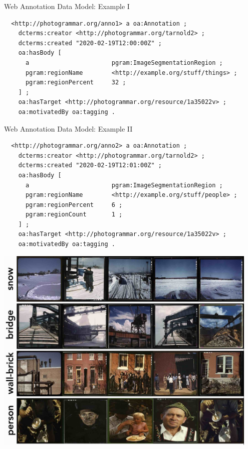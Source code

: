 \documentclass[12pt,ignorenonframetext,aspectratio=169]{beamer}
\begin{document}
\begin{frame}[fragile]{Web Annotation Data Model: Example I}

\fontsize{9}{11}\selectfont

  \begin{verbatim}
  <http://photogrammar.org/anno1> a oa:Annotation ;
    dcterms:creator <http://photogrammar.org/tarnold2> ;
    dcterms:created "2020-02-19T12:00:00Z" ;
    oa:hasBody [
      a                       pgram:ImageSegmentationRegion ;
      pgram:regionName        <http://example.org/stuff/things> ;
      pgram:regionPercent     32 ;
    ] ;
    oa:hasTarget <http://photogrammar.org/resource/1a35022v> ;
    oa:motivatedBy oa:tagging .
  \end{verbatim}

\end{frame}


\begin{frame}[fragile]{Web Annotation Data Model: Example II}

\fontsize{9}{11}\selectfont

  \begin{verbatim}
  <http://photogrammar.org/anno2> a oa:Annotation ;
    dcterms:creator <http://photogrammar.org/tarnold2> ;
    dcterms:created "2020-02-19T12:01:00Z" ;
    oa:hasBody [
      a                       pgram:ImageSegmentationRegion ;
      pgram:regionName        <http://example.org/stuff/people> ;
      pgram:regionPercent     6 ;
      pgram:regionCount       1 ;
    ] ;
    oa:hasTarget <http://photogrammar.org/resource/1a35022v> ;
    oa:motivatedBy oa:tagging .
  \end{verbatim}

\end{frame}


\begin{frame}{}

\begin{center}
\includegraphics[width=0.95\textwidth]{../figures/max_category_grid_labels_top.jpg}
\end{center}

\end{frame}
\end{document}
